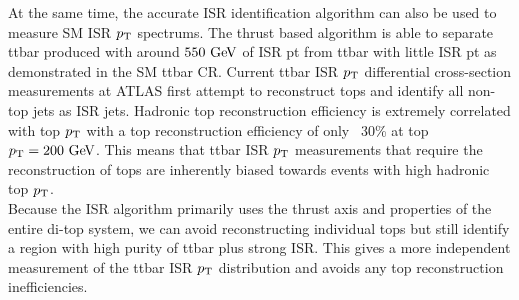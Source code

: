 \indent At the same time, the accurate ISR identification algorithm can also be used to measure SM ISR $p_{\mathrm{T}}$ spectrums.  The thrust based algorithm is able to separate ttbar produced with around $550 \gev$ of ISR pt from ttbar with little ISR pt as demonstrated in the SM ttbar CR.  Current ttbar ISR $p_{\mathrm{T}}$ differential cross-section measurements at ATLAS first attempt to reconstruct tops and identify all non-top jets as ISR jets.  Hadronic top reconstruction efficiency is extremely correlated with top $p_{\mathrm{T}}$ with a top reconstruction efficiency of only ~30\% at top $\pt = 200 \gev$.  This means that ttbar ISR $p_{\mathrm{T}}$ measurements that require the reconstruction of tops are inherently biased towards events with high hadronic top $p_{\mathrm{T}}$. \\

\indent Because the ISR algorithm primarily uses the thrust axis and properties of the entire di-top system, we can avoid reconstructing individual tops but still identify a region with high purity of ttbar plus strong ISR.  This gives a more independent measurement of the ttbar ISR $p_{\mathrm{T}}$ distribution and avoids any top reconstruction inefficiencies. \\
